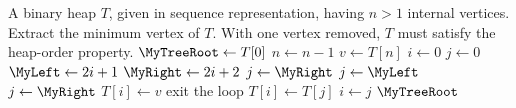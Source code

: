
\begin{algorithmic}[1]
\Require A binary heap $T$, given in sequence representation, having
  $n > 1$ internal vertices.
\Ensure Extract the minimum vertex of $T$. With one vertex removed,
  $T$ must satisfy the heap-order property.
\State $\MyTreeRoot \gets T[0]$
\State $n \gets n - 1$
\State $v \gets T[n]$
\State $i \gets 0$
\State $j \gets 0$
\While{$\MyTrue$}
  \State $\MyLeft \gets 2i + 1$
  \State $\MyRight \gets 2i + 2$
      \State $j \gets \MyRight$
    \Else
      \State $j \gets \MyLeft$
    \EndIf
    \State $j \gets \MyRight$
  \Else
    \State $T[i] \gets v$
    \State exit the loop
  \EndIf
  \State $T[i] \gets T[j]$
  \State $i \gets j$
\EndWhile
\State \Return $\MyTreeRoot$
\end{algorithmic}
